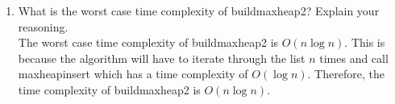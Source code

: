 \documentclass[12pt,letterpaper]{article}
\begin{document}
\begin{enumerate}
\begin{center}
\end{center}
    \item What is the worst case time complexity of buildmaxheap2? Explain your reasoning.
    \\[14pt]
    The worst case time complexity of buildmaxheap2 is $O(n \log n)$.
    This is because the algorithm will have to iterate through the list $n$ times
    and call maxheapinsert which has a time complexity of $O(\log n)$.
    Therefore, the time complexity of buildmaxheap2 is $O(n \log n)$.

\end{enumerate}
\end{document}

